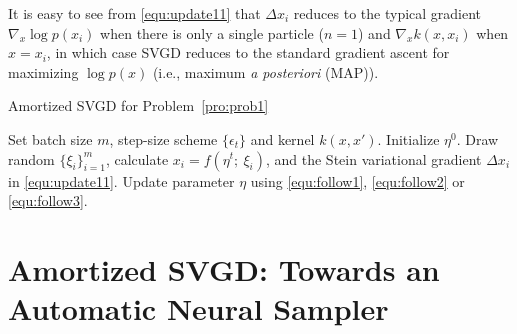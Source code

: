 \documentclass{article} %
\begin{document}
It is easy to see from \eqref{equ:update11} that $\Delta x_i$ reduces to the typical gradient $\nabla_x \log p(x_i)$ when there is only a single particle ($n=1$) and $\nabla_x k(x,x_i)$ when $x=x_i$,  
in which case SVGD reduces to the standard gradient ascent for maximizing $\log p(x)$ (i.e., maximum \emph{a posteriori} (MAP)). 


\begin{algorithm}[t]                      %
\caption{Amortized SVGD for Problem~\ref{pro:prob1}}%
\label{alg:alg1}                           %
\begin{algorithmic}                    %
\STATE Set batch size $m$, step-size scheme $\{\epsilon_t\}$ and kernel $k(x,x')$. Initialize $\eta^0$. 
\STATE  Draw random $\{\xi_i\}_{i=1}^m$, calculate $x_i = f(\eta^t;~\xi_i)$, 
and the Stein variational gradient $\Delta x_i$ in \eqref{equ:update11}. 
\STATE  Update parameter $\eta$ using \eqref{equ:follow1}, \eqref{equ:follow2} or \eqref{equ:follow3}. 
\ENDFOR
\end{algorithmic}
\end{algorithm}

\section{Amortized SVGD: Towards an Automatic Neural Sampler}
\label{sec:amortizedsvgd}
\end{document}
